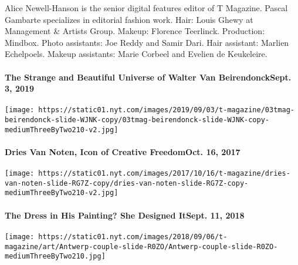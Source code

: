 Alice Newell-Hanson is the senior digital features editor of T Magazine.
Pascal Gambarte specializes in editorial fashion work. Hair: Louis Ghewy
at Management \& Artists Group. Makeup: Florence Teerlinck. Production:
Mindbox. Photo assistants: Joe Reddy and Samir Dari. Hair assistant:
Marlien Echelpoels. Makeup assistants: Marie Corbeel and Evelien de
Keukeleire.

\href{https://www.nytimes.com/2019/09/03/t-magazine/walter-van-beirendonck.html}{}

\hypertarget{the-strange-and-beautiful-universe-of-walter-van-beirendoncksept-3-2019}{%
\paragraph{The Strange and Beautiful Universe of Walter Van
BeirendonckSept. 3,
2019}\label{the-strange-and-beautiful-universe-of-walter-van-beirendoncksept-3-2019}}

\texttt{[image: https://static01.nyt.com/images/2019/09/03/t-magazine/03tmag-beirendonck-slide-WJNK-copy/03tmag-beirendonck-slide-WJNK-copy-mediumThreeByTwo210-v2.jpg]}
\href{https://www.nytimes.com/2017/10/16/t-magazine/dries-van-noten.html}{}

\hypertarget{dries-van-noten-icon-of-creative-freedomoct-16-2017}{%
\paragraph{Dries Van Noten, Icon of Creative FreedomOct. 16,
2017}\label{dries-van-noten-icon-of-creative-freedomoct-16-2017}}

\texttt{[image: https://static01.nyt.com/images/2017/10/16/t-magazine/dries-van-noten-slide-RG7Z-copy/dries-van-noten-slide-RG7Z-copy-mediumThreeByTwo210-v2.jpg]}
\href{https://www.nytimes.com/2018/09/11/t-magazine/charlotte-de-geyter-designer-bernadette-ben-sledsens-art.html}{}

\hypertarget{the-dress-in-his-painting-she-designed-itsept-11-2018}{%
\paragraph{The Dress in His Painting? She Designed ItSept. 11,
2018}\label{the-dress-in-his-painting-she-designed-itsept-11-2018}}

\texttt{[image: https://static01.nyt.com/images/2018/09/06/t-magazine/art/Antwerp-couple-slide-R0ZO/Antwerp-couple-slide-R0ZO-mediumThreeByTwo210.jpg]}
\href{https://www.nytimes.com/2019/11/29/t-magazine/kris-van-assche-berluti.html}{}

